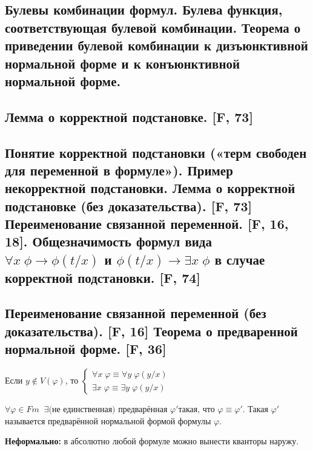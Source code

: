 \documentclass[a4paper, fleqn]{article}
\begin{document}
    \subsection{ Булевы комбинации формул. Булева функция, соответствующая булевой комбинации. Теорема о приведении булевой комбинации к дизъюнктивной нормальной форме и к конъюнктивной нормальной форме.}

    \subsection{Лемма о корректной подстановке. [F, 73]}

    \subsection{Понятие корректной подстановки («терм свободен для переменной в формуле»). Пример некорректной подстановки. Лемма о корректной подстановке (без доказательства). [F, 73] Переименование связанной переменной. [F, 16, 18]. Общезначимость формул вида $\forall x \; \phi \to \phi(t/x)$ и $\phi(t/x) \to \exists x \; \phi$ в случае корректной подстановки. [F, 74]}

    \subsection{Переименование связанной переменной (без доказательства). [F, 16] Теорема о предваренной нормальной форме. [F, 36]}
    \begin{proposition}

        Если $y \notin V(\varphi)$, то $\begin{cases}
        \forall x \; \varphi \equiv \forall y \; \varphi(y/x) \\
        \exists x \; \varphi \equiv \exists y \; \varphi(y/x)
        \end{cases}$
    \end{proposition}

    \begin{theorem}
        $\forall \varphi \in Fm \;\; \exists \text{(не единственная) предварённая } \varphi' \text{такая, что } \varphi \equiv \varphi'$. Такая $\varphi'$ называется предварённой нормальной формой формулы $\varphi$.
    \end{theorem}

    \textbf{Неформально:} в абсолютно любой формуле можно вынести кванторы наружу.
\end{document}
